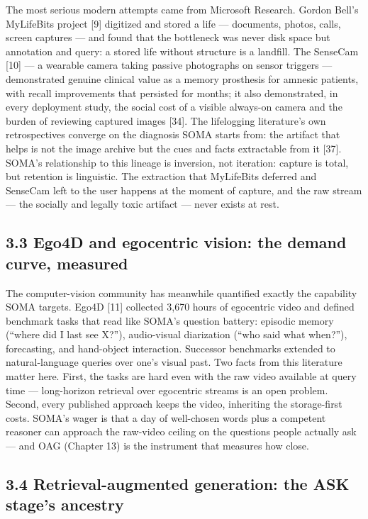 The most serious modern attempts came from Microsoft Research. Gordon Bell's MyLifeBits project {[}9{]} digitized and stored a life --- documents, photos, calls, screen captures --- and found that the bottleneck was never disk space but annotation and query: a stored life without structure is a landfill. The SenseCam {[}10{]} --- a wearable camera taking passive photographs on sensor triggers --- demonstrated genuine clinical value as a memory prosthesis for amnesic patients, with recall improvements that persisted for months; it also demonstrated, in every deployment study, the social cost of a visible always-on camera and the burden of reviewing captured images {[}34{]}. The lifelogging literature's own retrospectives converge on the diagnosis SOMA starts from: the artifact that helps is not the image archive but the cues and facts extractable from it {[}37{]}. SOMA's relationship to this lineage is inversion, not iteration: capture is total, but retention is linguistic. The extraction that MyLifeBits deferred and SenseCam left to the user happens at the moment of capture, and the raw stream --- the socially and legally toxic artifact --- never exists at rest.

\subsection{3.3 Ego4D and egocentric vision: the demand curve, measured}\label{ego4d-and-egocentric-vision-the-demand-curve-measured}

The computer-vision community has meanwhile quantified exactly the capability SOMA targets. Ego4D {[}11{]} collected 3,670 hours of egocentric video and defined benchmark tasks that read like SOMA's question battery: episodic memory (``where did I last see X?''), audio-visual diarization (``who said what when?''), forecasting, and hand-object interaction. Successor benchmarks extended to natural-language queries over one's visual past. Two facts from this literature matter here. First, the tasks are hard even with the raw video available at query time --- long-horizon retrieval over egocentric streams is an open problem. Second, every published approach keeps the video, inheriting the storage-first costs. SOMA's wager is that a day of well-chosen words plus a competent reasoner can approach the raw-video ceiling on the questions people actually ask --- and OAG (Chapter 13) is the instrument that measures how close.

\subsection{3.4 Retrieval-augmented generation: the ASK stage's ancestry}\label{retrieval-augmented-generation-the-ask-stages-ancestry}

